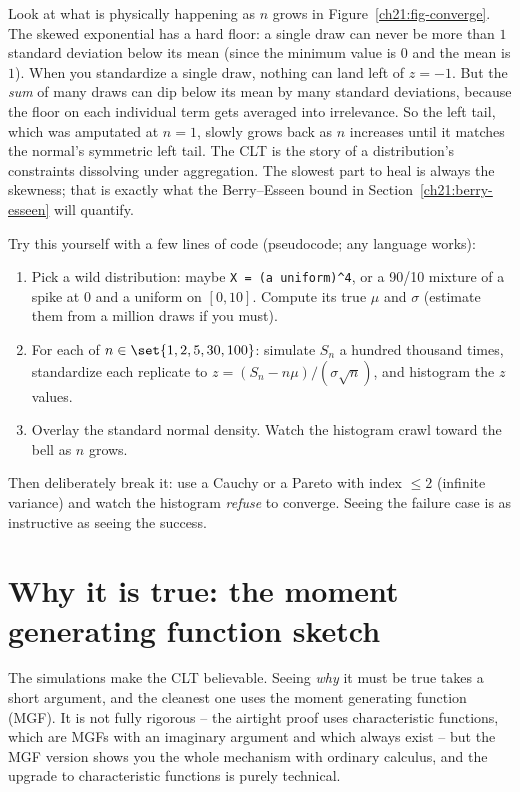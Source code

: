 \begin{happeningbox}
Look at what is physically happening as $n$ grows in
Figure~\ref{ch21:fig-converge}. The skewed exponential has a hard floor: a single draw
can never be more than $1$ standard deviation below its mean (since the minimum value
is $0$ and the mean is $1$). When you standardize a single draw, nothing can land left
of $z=-1$. But the \emph{sum} of many draws can dip below its mean by many standard
deviations, because the floor on each individual term gets averaged into irrelevance.
So the left tail, which was amputated at $n=1$, slowly grows back as $n$ increases until
it matches the normal's symmetric left tail. The CLT is the story of a distribution's
constraints dissolving under aggregation. The slowest part to heal is always the
skewness; that is exactly what the Berry--Esseen bound in
Section~\ref{ch21:berry-esseen} will quantify.
\end{happeningbox}

\begin{labbox}
Try this yourself with a few lines of code (pseudocode; any language works):
\begin{enumerate}
\item Pick a wild distribution: maybe \texttt{X = (a uniform)\^{}4}, or a 90/10 mixture
of a spike at $0$ and a uniform on $[0,10]$. Compute its true $\mu$ and $\sigma$
(estimate them from a million draws if you must).
\item For each of $n \in \set{1, 2, 5, 30, 100}$: simulate $S_n$ a hundred thousand
times, standardize each replicate to $z = (S_n - n\mu)/(\sigma\sqrt n)$, and histogram
the $z$ values.
\item Overlay the standard normal density. Watch the histogram crawl toward the bell as
$n$ grows.
\end{enumerate}
Then deliberately break it: use a Cauchy or a Pareto with index $\le 2$ (infinite
variance) and watch the histogram \emph{refuse} to converge. Seeing the failure case is
as instructive as seeing the success.
\end{labbox}

\section{Why it is true: the moment generating function sketch}
\label{ch21:why}

The simulations make the CLT believable. Seeing \emph{why} it must be true takes a
short argument, and the cleanest one uses the moment generating function (MGF). It is not fully
rigorous -- the airtight proof uses characteristic functions, which are MGFs with an
imaginary argument and which always exist -- but the MGF version shows you the whole
mechanism with ordinary calculus, and the upgrade to characteristic functions is purely
technical.

